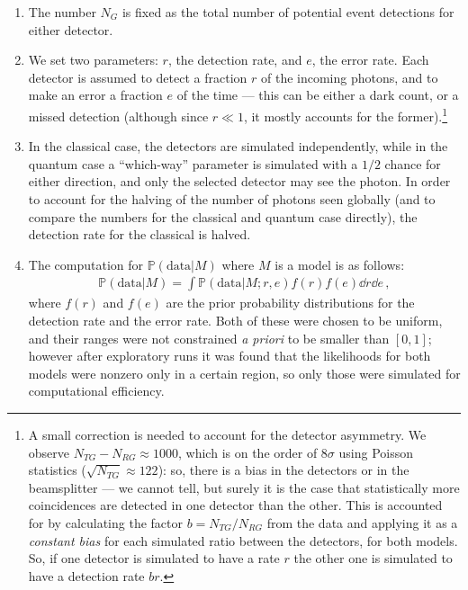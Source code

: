 \documentclass[main.tex]{subfiles}
\begin{document}
\begin{enumerate}
    \item The number \(N_G\) is fixed as the total number of potential event detections for either detector. 
    \item We set two parameters: \(r\), the detection rate, and \(e\), the error rate.
    Each detector is assumed to detect a fraction \(r\) of the incoming photons, and to make an error a fraction \(e\) of the time --- this can be either a dark count, or a missed detection (although since \(r \ll 1\), it mostly accounts for the former).\footnote{A small correction is needed to account for the detector asymmetry. We observe \(N_{TG} - N_{RG} \approx 1000\), which is on the order of \(8 \sigma \) using Poisson statistics (\(\sqrt{N_{TG}} \approx 122\)): so, there is a bias in the detectors or in the beamsplitter --- we cannot tell, but surely it is the case that statistically more coincidences are detected in one detector than the other. This is accounted for by calculating the factor \(b = N_{TG} / N_{RG}\) from the data and applying it as a \emph{constant bias} for each simulated ratio between the detectors, for both models. So, if one detector is simulated to have a rate \(r\) the other one is simulated to have a detection rate \(br\).}
    \item In the classical case, the detectors are simulated independently, while in the quantum case a ``which-way'' parameter is simulated with a \(1/2\) chance for either direction, and only the selected detector may see the photon. In order to account for the halving of the number of photons seen globally (and to compare the numbers for the classical and quantum case directly), the detection rate for the classical is halved.
    \item The computation for \(\mathbb{P}(\text{data} | M)\) where \(M\) is a model is as follows: 
    \begin{align}
    \mathbb{P}(\text{data} | M) = 
    \int \mathbb{P}(\text{data} | M; r, e) f(r) f(e) \dd{r} \dd{e}
    \,,
    \end{align}
    where \(f(r)\) and \(f(e)\) are the prior probability distributions for the detection rate and the error rate. 
    Both of these were chosen to be uniform, and their ranges were not constrained \emph{a priori} to be smaller than \([0,1]\); however after exploratory runs it was found that the likelihoods for both models were nonzero only in a certain region, so only those were simulated for computational efficiency.
    

\end{enumerate}
\end{document}

